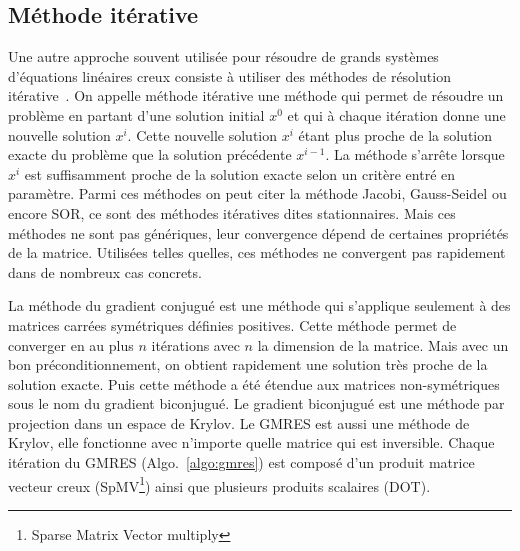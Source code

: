 \subsection{Méthode itérative}
Une autre approche souvent utilisée pour résoudre de grands systèmes d'équations linéaires creux consiste à utiliser des méthodes de résolution itérative~\cite{Saad96IMSLS}.
%
On appelle méthode itérative une méthode qui permet de résoudre un problème en partant d'une solution initial $x^0$ et qui à chaque itération donne une nouvelle solution $x^i$.
%
Cette nouvelle solution $x^i$ étant plus proche de la solution exacte du problème que la solution précédente $x^{i-1}$.
%
La méthode s'arrête lorsque $x^i$ est suffisamment proche de la solution exacte selon un critère entré en paramètre.
%
Parmi ces méthodes on peut citer la méthode Jacobi, Gauss-Seidel ou encore SOR, ce sont des méthodes itératives dites stationnaires.
%
Mais ces méthodes ne sont pas génériques, leur convergence dépend de certaines propriétés de la matrice.
%
Utilisées telles quelles, ces méthodes ne convergent pas rapidement dans de nombreux cas concrets.


La méthode du gradient conjugué est une méthode qui s'applique seulement à des matrices carrées symétriques définies positives.
%
Cette méthode permet de converger en au plus $n$ itérations avec $n$ la dimension de la matrice.
%
Mais avec un bon préconditionnement, on obtient rapidement une solution très proche de la solution exacte.
%
Puis cette méthode a été étendue aux matrices non-symétriques sous le nom du gradient biconjugué.
%
Le gradient biconjugué est une méthode par projection dans un espace de Krylov.
%
Le GMRES est aussi une méthode de Krylov, elle fonctionne avec n'importe quelle matrice qui est inversible.
%
Chaque itération du GMRES (Algo.~\ref{algo:gmres}) est composé d'un produit matrice vecteur creux (SpMV\footnote{Sparse Matrix Vector multiply}) ainsi que plusieurs produits scalaires (DOT).

